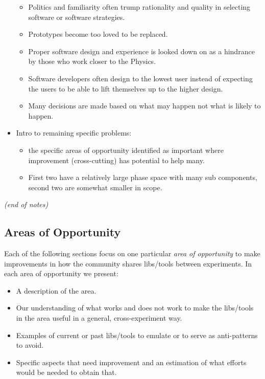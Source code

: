 \begin{itemize}
\begin{itemize}
\item Politics and familiarity often trump rationality and quality in selecting software or software strategies.
\item Prototypes become too loved to be replaced.
\item Proper software design and experience is looked down on as a hindrance by those who work closer to the Physics.
\item Software developers often design to the lowest user instead of expecting the users to be able to lift themselves up to the higher design.
\item Many decisions are made based on what may happen not what is likely to happen.
  \end{itemize}

\item Intro to remaining specific problems:
\begin{itemize}
\item the specific areas of opportunity identified as important where improvement (cross-cutting) has potential to help many.
\item First two have a relatively large phase space with many sub components, second two are somewhat smaller in scope.
\end{itemize}

\end{itemize}
\textit{(end of notes)  }

\subsection{Areas of Opportunity}

Each of the following sections focus on one particular \textit{area of opportunity} to make improvements in how the community shares libs/tools between experiments.  In each area of opportunity we present:

\begin{itemize}
\item A description of the area.
\item Our understanding of what works and does not work to make the libs/tools in the area useful in a general, cross-experiment way.
\item Examples of current or past libs/tools to emulate or to serve as anti-patterns to avoid.
\item Specific aspects that need improvement and an estimation of what efforts would be needed to obtain that.
\end{itemize}
